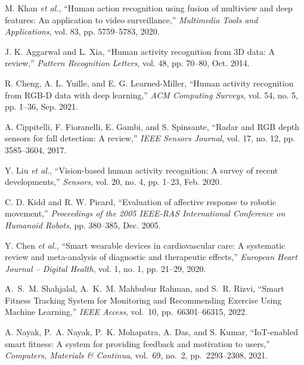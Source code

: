\documentclass[conference]{IEEEtran}
\begin{document}
\begin{thebibliography}{00}
 M. Khan \textit{et al.}, ``Human action recognition using fusion of multiview and deep features: An application to video surveillance,'' \textit{Multimedia Tools and Applications}, vol. 83, pp. 5759--5783, 2020.

 J. K. Aggarwal and L. Xia, ``Human activity recognition from 3D data: A review,'' \textit{Pattern Recognition Letters}, vol. 48, pp. 70--80, Oct. 2014.

 R. Cheng, A. L. Yuille, and E. G. Learned-Miller, ``Human activity recognition from RGB-D data with deep learning,'' \textit{ACM Computing Surveys}, vol. 54, no. 5, pp. 1--36, Sep. 2021.

 A. Cippitelli, F. Fioranelli, E. Gambi, and S. Spinsante, ``Radar and RGB depth sensors for fall detection: A review,'' \textit{IEEE Sensors Journal}, vol. 17, no. 12, pp. 3585--3604, 2017.

 Y. Liu \textit{et al.}, ``Vision-based human activity recognition: A survey of recent developments,'' \textit{Sensors}, vol. 20, no. 4, pp. 1--23, Feb. 2020.

 C. D. Kidd and R. W. Picard, ``Evaluation of affective response to robotic movement,'' \textit{Proceedings of the 2005 IEEE-RAS International Conference on Humanoid Robots}, pp. 380--385, Dec. 2005.

 Y. Chen \textit{et al.}, ``Smart wearable devices in cardiovascular care: A systematic review and meta-analysis of diagnostic and therapeutic effects,'' \textit{European Heart Journal – Digital Health}, vol. 1, no. 1, pp. 21--29, 2020.


A.~S.~M. Shahjalal, A.~K.~M. Mahbubur Rahman, and S.~R. Rizvi, ``Smart Fitness Tracking System for Monitoring and Recommending Exercise Using Machine Learning,'' \emph{IEEE Access}, vol.~10, pp.~66301--66315, 2022.

A. Nayak, P.~A. Nayak, P.~K. Mohapatra, A. Das, and S. Kumar, ``IoT-enabled smart fitness: A system for providing feedback and motivation to users,'' \emph{Computers, Materials \& Continua}, vol.~69, no.~2, pp.~2293--2308, 2021.


\end{thebibliography}
\end{document}
